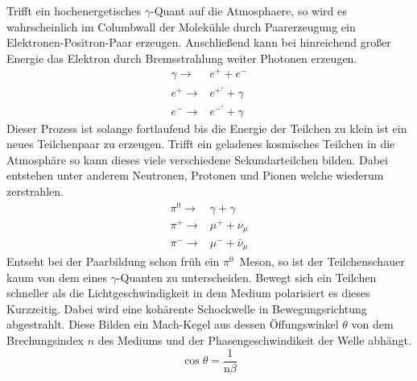 Trifft ein hochenergetisches $\gamma$-Quant auf die Atmosphaere, so wird es wahrscheinlich im Columbwall der Molekühle durch Paarerzeugung ein Elektronen-Positron-Paar erzeugen. Anschließend kann bei hinreichend großer Energie das Elektron durch Bremsstrahlung weiter Photonen erzeugen. 
\begin{eqnarray}
  \gamma \rightarrow& e^{+} + e^{-} \\
  e^{+} \rightarrow& e^{+'} + \gamma \\
  e^{-} \rightarrow& e^{-'} + \gamma 
\end{eqnarray}
Dieser Prozess ist solange fortlaufend bis die Energie der Teilchen zu klein ist ein neues Teilchenpaar zu erzeugen. Trifft ein geladenes kosmisches Teilchen in die Atmosphäre so kann dieses viele verschiedene Sekundarteilchen bilden. Dabei entstehen unter anderem Neutronen, Protonen und Pionen welche wiederum zerstrahlen. 
\begin{eqnarray}
  \pi^{0} \rightarrow& \gamma + \gamma \\
  \pi^{+} \rightarrow& \mu^{+} + \nu_{\mu} \\
  \pi^{-} \rightarrow& \mu^{-} + \bar{\nu}_{\mu}
\end{eqnarray}
Entseht bei der Paarbildung schon früh ein $\pi^{0}$~Meson, so ist der Teilchenschauer kaum von dem eines $\gamma$-Quanten zu unterscheiden. \newline
Bewegt sich ein Teilchen schneller als die Lichtgeschwindigkeit in dem Medium polarisiert es dieses Kurzzeitig. Dabei wird eine kohärente Schockwelle in Bewegungsrichtung abgestrahlt. Diese Bilden ein Mach-Kegel aus dessen Öffungswinkel $\theta$ von dem Brechungsindex $n$ des Mediums und der Phasengeschwindikeit der Welle abhängt.
\begin{equation}
  \cos  \theta = \frac{1}{\text{n} \beta}
\end{equation}

